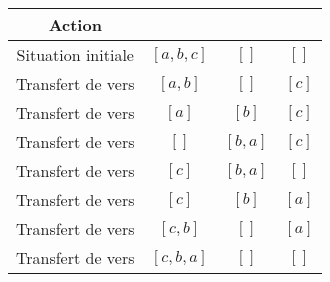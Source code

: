 \begin{center}
	\begin{tabular}{| c | c | c | c |}
		\hline
		Action & \pun & \pdeux & \ptrois \\
		\hline
		Situation initiale & $[a,b,c]$ & $[]$ & $[]$ \\
		\hline
		Transfert de \pun vers \ptrois & $[a,b]$ & $[]$ & $[c]$ \\
		\hline
		Transfert de \pun vers \pdeux & $[a]$ & $[b]$ & $[c]$ \\
		\hline
		Transfert de \pun vers \pdeux & $[]$ & $[b, a]$ & $[c]$ \\
		\hline
		Transfert de \ptrois vers \pun & $[c]$ & $[b,a]$ & $[]$ \\
		\hline
		Transfert de \pdeux vers \ptrois & $[c]$ & $[b]$ & $[a]$ \\
		\hline
		Transfert de \pdeux vers \pun & $[c,b]$ & $[]$ & $[a]$ \\
		\hline
		Transfert de \ptrois vers \pun & $[c,b,a]$ & $[]$ & $[]$ \\
		\hline
	\end{tabular}
\end{center}
